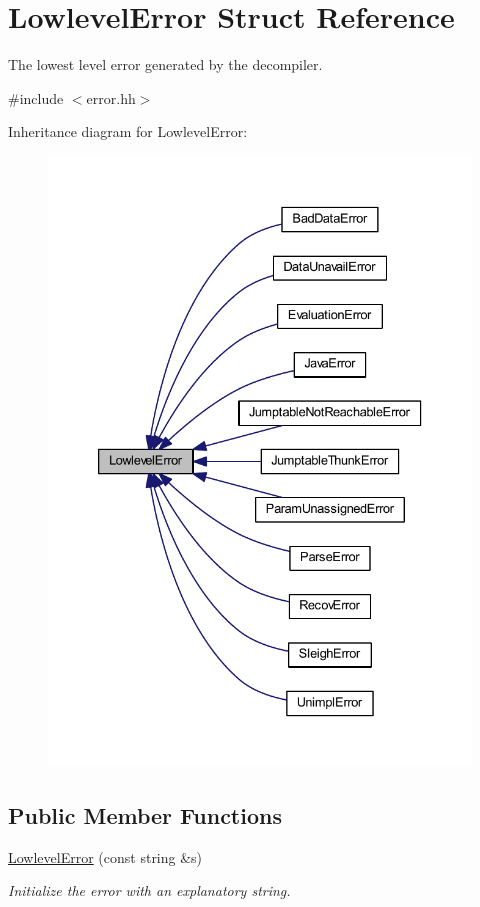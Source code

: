\hypertarget{struct_lowlevel_error}{}\section{Lowlevel\+Error Struct Reference}
\label{struct_lowlevel_error}


The lowest level error generated by the decompiler.  




{\ttfamily \#include $<$error.\+hh$>$}



Inheritance diagram for Lowlevel\+Error\+:
\nopagebreak
\begin{figure}[H]
\begin{center}
\leavevmode
\includegraphics[width=333pt]{struct_lowlevel_error__inherit__graph}
\end{center}
\end{figure}
\subsection*{Public Member Functions}
\begin{DoxyCompactItemize}
\item 
\mbox{\hyperlink{struct_lowlevel_error_a73f4fa337533b013009b50f2bb68f57a}{Lowlevel\+Error}} (const string \&s)
\begin{DoxyCompactList}\small\item\em Initialize the error with an explanatory string. \end{DoxyCompactList}\end{DoxyCompactItemize}
